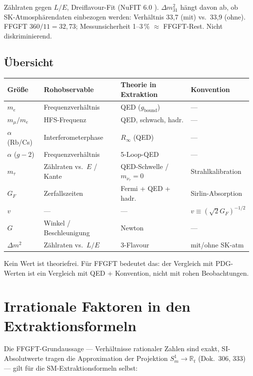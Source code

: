 Zählraten gegen $L/E$, Dreiflavour-Fit (NuFIT 6.0 \QM). $\Delta m^2_{31}$ hängt davon ab, ob SK-Atmosphärendaten einbezogen werden: Verhältnis 33{,}7 (mit) vs.\ 33{,}9 (ohne). FFGFT $360/11=32{,}73$; Messunsicherheit 1--3\,\% $\approx$ FFGFT-Rest. Nicht diskriminierend.

\subsection{Übersicht}

\begin{center}
\begin{tabular}{@{}llll@{}}
\toprule
Größe & Rohobservable & Theorie in Extraktion & Konvention \\
\midrule
$m_e$ & Frequenzverhältnis & QED ($g_\text{bound}$) & --- \\
$m_\mu/m_e$ & HFS-Frequenz & QED, schwach, hadr. & --- \\
$\alpha$ (Rb/Cs) & Interferometerphase & $R_\infty$ (QED) & --- \\
$\alpha$ ($g-2$) & Frequenzverhältnis & 5-Loop-QED & --- \\
$m_\tau$ & Zählraten vs.\ $E$ / Kante & QED-Schwelle / $m_{\nu_\tau}=0$ & Strahlkalibration \\
$G_F$ & Zerfallszeiten & Fermi + QED + hadr. & Sirlin-Absorption \\
$v$ & --- & --- & $v\equiv(\sqrt2G_F)^{-1/2}$ \\
$G$ & Winkel / Beschleunigung & Newton & --- \\
$\Delta m^2$ & Zählraten vs.\ $L/E$ & 3-Flavour & mit/ohne SK-atm \\
\bottomrule
\end{tabular}
\end{center}

Kein Wert ist theoriefrei. Für FFGFT bedeutet das: der Vergleich mit PDG-Werten ist ein Vergleich mit \glqq QED + Konvention\grqq, nicht mit rohen Beobachtungen.

\section{Irrationale Faktoren in den Extraktionsformeln}

Die FFGFT-Grundaussage --- Verhältnisse rationaler Zahlen sind exakt, SI-Absolutwerte tragen die Approximation der Projektion $S^1_m\to\mathbb R_t$ (Dok.~306, 333) --- gilt für die SM-Extraktionsformeln selbst:

